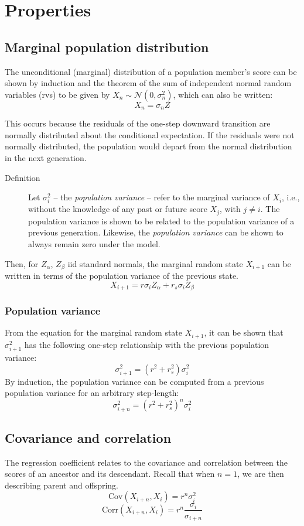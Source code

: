 \documentclass[letterpaper,10pt]{article} %
\begin{document}
\section{Properties}
\subsection{Marginal population distribution}
The unconditional (marginal) distribution of a population member's score can be shown by induction and the theorem of the sum of independent normal random variables (rvs) to be given by $X_n \sim \mathcal{N}(0, \sigma_n^2)$, which can also be written:
$$X_n = \sigma_nZ$$

This occurs because the residuals of the one-step downward transition are normally distributed about the conditional expectation. If the residuals were not normally distributed, the population would depart from the normal distribution in the next generation.

\begin{description}
\item [Definition] Let $\sigma_i^2$ -- the \emph{population variance} -- refer to the marginal variance of $X_i$, i.e., without the knowledge of any past or future score $X_{j}$, with $j \neq i$. The population variance is shown to be related to the population variance of a previous generation. Likewise, the \emph{population variance} can be shown to always remain zero under the model. 
\end{description}

Then, for $Z_\alpha$, $Z_\beta$ iid standard normals, the marginal random state $X_{i+1}$ can be written in terms of the population variance of the previous state.
$$X_{i+1} = r\sigma_iZ_\alpha + r_s\sigma_iZ_\beta$$

\subsubsection*{Population variance}
From the equation for the marginal random state $X_{i+1}$, it can be shown that $\sigma_{i+1}^2$ has the following one-step relationship with the previous population variance:
$$\sigma_{i+1}^2 = (r^2+r_s^2)  \sigma_i^2$$
By induction, the population variance can be computed from a previous population variance for an arbitrary step-length:
$$\sigma_{i+n}^2 = (r^2+r_s^2)^n  \sigma_{i}^2$$




\subsection{Covariance and correlation}
The regression coefficient relates to the covariance and correlation between the scores of an ancestor and its descendant. Recall that when $n = 1$, we are then describing parent and offspring. 
$$\mathrm{Cov}(X_{i+n}, X_i) = r^n \sigma_i^2$$
$$\mathrm{Corr}(X_{i+n}, X_i) = r^n \frac{\sigma_i}{\sigma_{i+n}}$$
\end{document}
